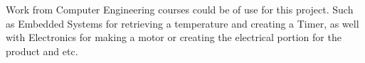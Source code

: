 Work from Computer Engineering courses could be of use for this project. Such as Embedded Systems for retrieving a temperature and creating a Timer, as well with Electronics for making a motor or creating the electrical portion for the product and etc.